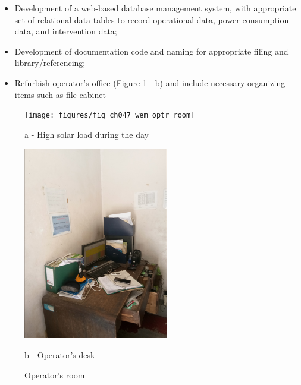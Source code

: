 \begin{itemize}
	\item Development of a web-based database management system, with appropriate set of relational data tables to record operational data, power consumption data, and intervention data;
	
	\item Development of documentation code and naming for appropriate filing and library/referencing;
	
	\item Refurbish operator’s office (Figure \ref{fig_ch047_wem_optr_room} - b) and include necessary organizing items such as file cabinet 
	
\end{itemize}

\begin{figure}[!htb]
	\begin{minipage}[b]{0.4\linewidth}
		\centering
		\texttt{[image: figures/fig\_ch047\_wem\_optr\_room]}
		\caption*{a - High solar load during the day}
	\end{minipage}
	\hspace{0.05cm}
	\begin{minipage}[b]{0.225\linewidth}
		\centering
		\includegraphics[width=\textwidth]{figures/fig_ch047_wem_optrsdesk}
		\caption*{b - Operator's desk}
	\end{minipage}
	\caption{Operator's room}
	\label{fig_ch047_wem_optr_room}
\end{figure}

